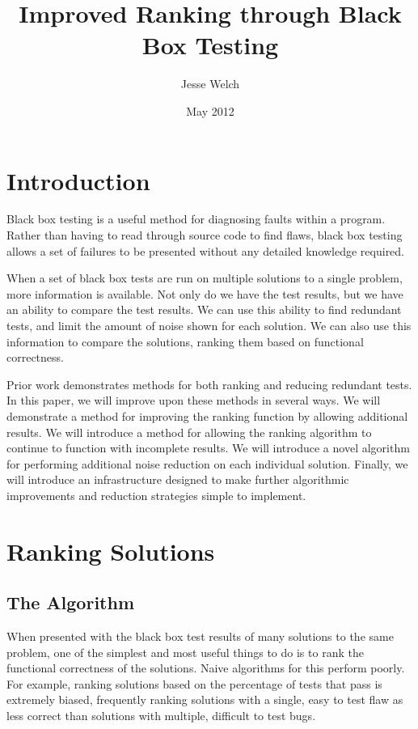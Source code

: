 \documentclass[11pt]{article}
\title{Improved Ranking through Black Box Testing}
\author{Jesse Welch}
\date{May 2012}
\begin{document}
\maketitle

\tableofcontents
\newpage

\section{Introduction}
Black box testing is a useful method for diagnosing faults within a program. Rather than having to read through source code to find flaws, black box testing allows a set of failures to be presented without any detailed knowledge required.

When a set of black box tests are run on multiple solutions to a single problem, more information is available. Not only do we have the test results, but we have an ability to compare the test results. We can use this ability to find redundant tests, and limit the amount of noise shown for each solution. We can also use this information to compare the solutions, ranking them based on functional correctness.

Prior work demonstrates methods for both ranking and reducing redundant tests. In this paper, we will improve upon these methods in several ways. We will demonstrate a method for improving the ranking function by allowing additional results. We will introduce a method for allowing the ranking algorithm to continue to function with incomplete results. We will introduce a novel algorithm for performing additional noise reduction on each individual solution. Finally, we will introduce an infrastructure designed to make further algorithmic improvements and reduction strategies simple to implement.

\section{Ranking Solutions}
\subsection{The Algorithm}
When presented with the black box test results of many solutions to the same problem, one of the simplest and most useful things to do is to rank the functional correctness of the solutions. Naive algorithms for this perform poorly. For example, ranking solutions based on the percentage of tests that pass is extremely biased, frequently ranking solutions with a single, easy to test flaw as less correct than solutions with multiple, difficult to test bugs.
\end{document}

